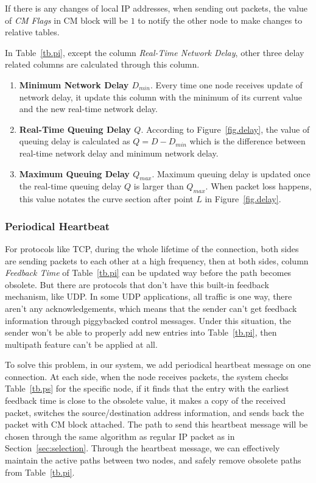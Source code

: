 If there is any changes of local IP addresses, when sending out packets, the value of \emph{CM Flags} in CM block will be $1$ to notify the other node to make changes to relative tables.

In Table~\ref{tb.pi}, except the column \emph{Real-Time Network Delay}, other three delay related columns are calculated through this column.

\begin{enumerate}
\item \textbf{Minimum Network Delay $D_{min}$}. Every time one node receives update of network delay, it update this column with the minimum of its current value and the new real-time network delay.
\item \textbf{Real-Time Queuing Delay $Q$}. According to Figure~\ref{fig.delay}, the value of queuing delay is calculated as $Q=D-D_{min}$ which is the difference between real-time network delay and minimum network delay.
\item \textbf{Maximum Queuing Delay $Q_{max}$}. Maximum queuing delay is updated once the real-time queuing delay $Q$ is larger than $Q_{max}$. When packet loss happens, this value notates the curve section after point $L$ in Figure~\ref{fig.delay}.
\end{enumerate}


\subsubsection{Periodical Heartbeat}

For protocols like TCP, during the whole lifetime of the connection, both sides are sending packets to each other at a high frequency, then at both sides, column \emph{Feedback Time} of Table~\ref{tb.pi} can be updated way before the path becomes obsolete. But there are protocols that don\textquoteright t have this built-in feedback mechanism, like UDP. In some UDP applications, all traffic is one way, there aren\textquoteright t any acknowledgements, which means that the sender can\textquoteright t get feedback information through piggybacked control messages. Under this situation, the sender won\textquoteright t be able to properly add new entries into Table~\ref{tb.pi}, then multipath feature can\textquoteright t be applied at all. 

To solve this problem, in our system, we add periodical heartbeat message on one connection. At each side, when the node receives packets, the system checks Table~\ref{tb.ps} for the specific node, if it finds that the entry with the earliest feedback time is close to the obsolete value, it makes a copy of the received packet, switches the source/destination address information, and sends back the packet with CM block attached. The path to send this heartbeat message will be chosen through the same algorithm as regular IP packet as in Section~\ref{sec:selection}. Through the heartbeat message, we can effectively maintain the active paths between two nodes, and safely remove obsolete paths from Table~\ref{tb.pi}. 


